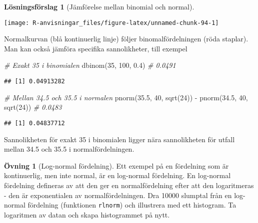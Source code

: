 \documentclass[
]{book}
\newenvironment{Shaded}{\begin{snugshade}}{\end{snugshade}}
\newcommand{\CommentTok}[1]{\textcolor[rgb]{0.56,0.35,0.01}{\textit{#1}}}
\newcommand{\DecValTok}[1]{\textcolor[rgb]{0.00,0.00,0.81}{#1}}
\newcommand{\FloatTok}[1]{\textcolor[rgb]{0.00,0.00,0.81}{#1}}
\newcommand{\FunctionTok}[1]{\textcolor[rgb]{0.00,0.00,0.00}{#1}}
\newcommand{\NormalTok}[1]{#1}
\newcommand{\SpecialCharTok}[1]{\textcolor[rgb]{0.00,0.00,0.00}{#1}}
\theoremstyle{definition}
\theoremstyle{definition}
\theoremstyle{definition}
\newtheorem{exercise}{Övning}[chapter]
\theoremstyle{definition}
\newtheorem{hypothesis}{Lösningsförslag}[chapter]
\theoremstyle{remark}
\begin{document}
\begin{hypothesis}[Jämförelse mellan binomial och normal]
\begin{center}\texttt{[image: R-anvisningar\_files/figure-latex/unnamed-chunk-94-1]} \end{center}

Normalkurvan (blå kontinuerlig linje) följer binomalfördelningen (röda staplar). Man kan också jämföra specifika sannolikheter, till exempel

\begin{Shaded}
\begin{Highlighting}[]
\CommentTok{\# Exakt 35 i binomialen}
\FunctionTok{dbinom}\NormalTok{(}\DecValTok{35}\NormalTok{, }\DecValTok{100}\NormalTok{, }\FloatTok{0.4}\NormalTok{) }\CommentTok{\# 0.0491}
\end{Highlighting}
\end{Shaded}

\begin{verbatim}
## [1] 0.04913282
\end{verbatim}

\begin{Shaded}
\begin{Highlighting}[]
\CommentTok{\# Mellan 34.5 och 35.5 i normalen}
\FunctionTok{pnorm}\NormalTok{(}\FloatTok{35.5}\NormalTok{, }\DecValTok{40}\NormalTok{, }\FunctionTok{sqrt}\NormalTok{(}\DecValTok{24}\NormalTok{)) }\SpecialCharTok{{-}} \FunctionTok{pnorm}\NormalTok{(}\FloatTok{34.5}\NormalTok{, }\DecValTok{40}\NormalTok{, }\FunctionTok{sqrt}\NormalTok{(}\DecValTok{24}\NormalTok{)) }\CommentTok{\# 0.0483}
\end{Highlighting}
\end{Shaded}

\begin{verbatim}
## [1] 0.04837712
\end{verbatim}

Sannolikheten för exakt 35 i binomialen ligger nära sannolikheten för utfall mellan 34.5 och 35.5 i normalfördelningen.
\end{hypothesis}

\begin{exercise}[Log-normal fördelning]
Ett exempel på en fördelning som är kontinuerlig, men inte normal, är en log-normal fördelning. En log-normal fördelning defineras av att den ger en normalfördelning efter att den logaritmeras - den är exponentialen av normalfördelningen. Dra 10000 slumptal från en log-normal fördelning (funktionen \texttt{rlnorm}) och illustrera med ett histogram. Ta logaritmen av datan och skapa histogrammet på nytt.
\end{exercise}
\end{document}
